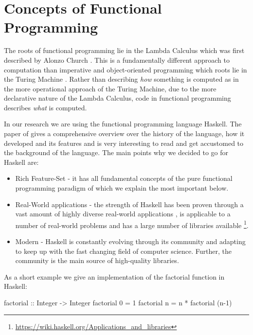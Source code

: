 \section{Concepts of Functional Programming}
The roots of functional programming lie in the Lambda Calculus which was first described by Alonzo Church \citep{church_unsolvable_1936}. This is a fundamentally different approach to computation than imperative and object-oriented programming which roots lie in the Turing Machine \citep{turing_computable_1937}. Rather than describing \textit{how} something is computed as in the more operational approach of the Turing Machine, due to the more declarative nature of the Lambda Calculus, code in functional programming describes \textit{what} is computed.

In our research we are using the functional programming language Haskell. The paper of \citep{hudak_history_2007} gives a comprehensive overview over the history of the language, how it developed and its features and is very interesting to read and get accustomed to the background of the language. The main points why we decided to go for Haskell are:

\begin{itemize}
	\item Rich Feature-Set - it has all fundamental concepts of the pure functional programming paradigm of which we explain the most important below.
	\item Real-World applications - the strength of Haskell has been proven through a vast amount of highly diverse real-world applications \cite{hudak_history_2007}, is applicable to a number of real-world problems \cite{osullivan_real_2008} and has a large number of libraries available \footnote{\url{https://wiki.haskell.org/Applications_and_libraries}}.
	\item Modern - Haskell is constantly evolving through its community and adapting to keep up with the fast changing field of computer science. Further, the community is the main source of high-quality libraries.
\end{itemize}

As a short example we give an implementation of the factorial function in Haskell:
\begin{HaskellCode}
factorial :: Integer -> Integer
factorial 0 = 1
factorial n = n * factorial (n-1)
\end{HaskellCode}

